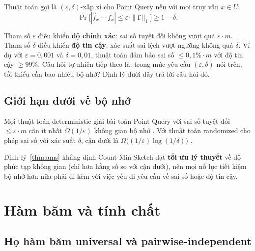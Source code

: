 \begin{definition}
\label{def:epsdelta}
Thuật toán gọi là $(\varepsilon, \delta)$-xấp xỉ cho Point Query nếu với mọi truy vấn $x \in U$:
\begin{equation}
\Pr\bigl[|\hat{f}_x - f_x| \le \varepsilon \cdot \|\mathbf{f}\|_1\bigr] \ge 1 - \delta.
\label{eq:eps-delta-accuracy}
\end{equation}
\end{definition}

Tham số $\varepsilon$ điều khiển \textbf{độ chính xác}: sai số tuyệt đối không vượt quá $\varepsilon \cdot m$. Tham số $\delta$ điều khiển \textbf{độ tin cậy}: xác suất sai lệch vượt ngưỡng không quá $\delta$. Ví dụ với $\varepsilon = 0{,}001$ và $\delta = 0{,}01$, thuật toán đảm bảo sai số $\le 0{,}1\%\cdot m$ với độ tin cậy $\ge 99\%$. Câu hỏi tự nhiên tiếp theo là: trong mức yêu cầu $(\varepsilon, \delta)$ nói trên, tối thiểu cần bao nhiêu bộ nhớ? Định lý dưới đây trả lời câu hỏi đó.

\subsection{Giới hạn dưới về bộ nhớ}

\begin{theorem}
\label{thm:ams}
Mọi thuật toán deterministic giải bài toán Point Query với sai số tuyệt đối $\le \varepsilon \cdot m$ cần ít nhất $\Omega(1/\varepsilon)$ không gian bộ nhớ \cite{alon1996space}. Với thuật toán randomized cho phép sai số với xác suất $\delta$, cận dưới là $\Omega\bigl((1/\varepsilon)\log(1/\delta)\bigr)$ \cite{ganguly2012lower}.
\end{theorem}

Định lý~\ref{thm:ams} khẳng định Count-Min Sketch đạt \textbf{tối ưu lý thuyết} về độ phức tạp không gian (chỉ hơn hằng số so với cận dưới), nên mọi nỗ lực tiết kiệm bộ nhớ hơn nữa phải đi kèm với việc yếu đi yêu cầu về sai số hoặc độ tin cậy.

\section{Hàm băm và tính chất}

\subsection{Họ hàm băm universal và pairwise-independent}

